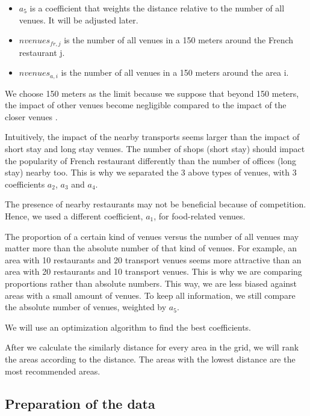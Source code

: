 \documentclass[12pt,a4paper]{article}
\begin{document}
\begin{itemize}
  \item $a_5$ is a coefficient that weights the distance relative to the number of all venues. It will be adjusted later.
  \item $nvenues_{fr,j}$ is the number of all venues in a 150 meters around the French restaurant j.
  \item $nvenues_{a,i}$ is the number of all venues in a 150 meters around the area i.

\end{itemize}

We choose 150 meters as the limit because we suppose that beyond 150 meters, the impact of other venues become negligible compared to the impact of the closer venues .

\medskip

Intuitively, the impact of the nearby transports seems larger than the impact of short stay and long stay venues. The number of shops (short stay) should impact the popularity of French restaurant differently than the number of offices (long stay) nearby too. This is why we separated the 3 above types of venues, with 3 coefficients $a_2$, $a_3$ and $a_4$.

\medskip

The presence of nearby restaurants may not be beneficial because of competition. Hence, we used a different coefficient, $a_1$, for food-related venues.

\medskip

The proportion of a certain kind of venues versus the number of all venues may matter more than the absolute number of that kind of venues. For example, an area with 10 restaurants and 20 transport venues seems more attractive than an area with 20 restaurants and 10 transport venues. This is why we are comparing proportions rather than absolute numbers. This way, we are less biased against areas with a small amount of venues. To keep all information, we still compare the absolute number of venues, weighted by $a_5$.

\medskip

We will use an optimization algorithm to find the best coefficients.

\medskip

After we calculate the similarly distance for every area in the grid, we will rank the areas according to the distance. The areas with the lowest distance are the most recommended areas.

\subsection{Preparation of the data}
\end{document}
